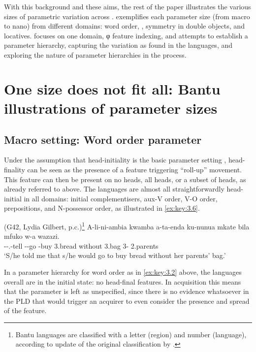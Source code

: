 \documentclass[output=paper]{langsci/langscibook}
\begin{document}
With this background and these aims, the rest of the paper illustrates the
various sizes of parametric variation across .
 exemplifies each parameter size (from macro to nano) from
different domains: word order, , symmetry in
double objects, and locatives.   focuses on one domain, φ
feature indexing, and attempts to establish a parameter
hierarchy, capturing the variation as found in the
 languages, and exploring the nature of parameter hierarchies in the
process.

\section{One size does not fit all: Bantu illustrations of parameter
sizes}\label{sec:3.2}

\subsection{Macro setting: Word order parameter}\label{sub:3.2.1}

Under the assumption that head-initiality is the basic parameter setting
\citep{Kayne1994}, head-finality can be seen as the presence of a
 feature triggering “roll-up” movement. This
feature can then be present on no heads, all heads, or a subset of heads, as
already referred to above. The  languages are almost all straightforwardly
head-initial in all domains: initial complementisers, aux-V order, V-O order,
prepositions, and N-possessor order, as illustrated in \eqref{ex:key:3.6}.

\ea\label{bkm:Ref343702566} (G42, Lydia Gilbert, p.c.)\footnote{Bantu languages are classified with a letter (region) and number (language), according to  update of the original classification by \citet{Guthrie1948}.}
    \sn
    \gll    A-li-ni-ambia  kwamba  a-ta-enda  ku-nunua  mkate bila  mfuko  w-a  wazazi.\\
            \First\Sm{}{}-\Pst-\Fsg{}.\Om{}-tell  \Comp{}  \First\Sm{}-\Fut-go \Inf{}-buy  3.bread without  3.bag  3-\Conn{}  2.parents\\
    \glt    ‘S/he told me that s/he would go to buy bread without her parents’ bag.’
\z

In a parameter hierarchy for word order as in \eqref{ex:key:3.2} above, the 
languages overall are in the initial state: no head-final features. In
acquisition this means that the parameter is left as unspecified, since there
is no evidence whatsoever in the \gls{PLD} that would trigger an acquirer to even
consider the presence and spread of the feature.
\end{document}
